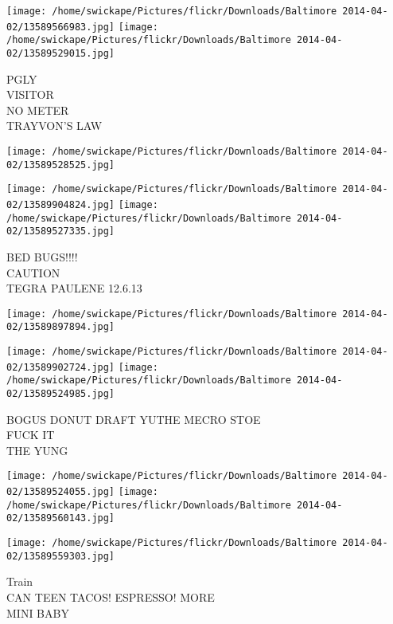 \documentclass[10pt,letterpaper]{article}
\begin{document}
\texttt{[image: /home/swickape/Pictures/flickr/Downloads/Baltimore 2014-04-02/13589566983.jpg]}
\texttt{[image: /home/swickape/Pictures/flickr/Downloads/Baltimore 2014-04-02/13589529015.jpg]}

PGLY\\
VISITOR\\
NO METER\\
TRAYVON'S LAW\\
\pagebreak

\texttt{[image: /home/swickape/Pictures/flickr/Downloads/Baltimore 2014-04-02/13589528525.jpg]}

\vspace{0.25in}
\texttt{[image: /home/swickape/Pictures/flickr/Downloads/Baltimore 2014-04-02/13589904824.jpg]}
\texttt{[image: /home/swickape/Pictures/flickr/Downloads/Baltimore 2014-04-02/13589527335.jpg]}

BED BUGS!!!!\\
CAUTION\\
TEGRA PAULENE 12.6.13\\
\pagebreak

\texttt{[image: /home/swickape/Pictures/flickr/Downloads/Baltimore 2014-04-02/13589897894.jpg]}

\vspace{0.25in}
\texttt{[image: /home/swickape/Pictures/flickr/Downloads/Baltimore 2014-04-02/13589902724.jpg]}
\texttt{[image: /home/swickape/Pictures/flickr/Downloads/Baltimore 2014-04-02/13589524985.jpg]}

BOGUS DONUT DRAFT YUTHE MECRO STOE\\
FUCK IT\\
THE YUNG\\
\pagebreak

\texttt{[image: /home/swickape/Pictures/flickr/Downloads/Baltimore 2014-04-02/13589524055.jpg]}
\texttt{[image: /home/swickape/Pictures/flickr/Downloads/Baltimore 2014-04-02/13589560143.jpg]}

\texttt{[image: /home/swickape/Pictures/flickr/Downloads/Baltimore 2014-04-02/13589559303.jpg]}

Train\\
CAN TEEN TACOS! ESPRESSO! MORE\\
MINI BABY\\
\pagebreak
\end{document}
